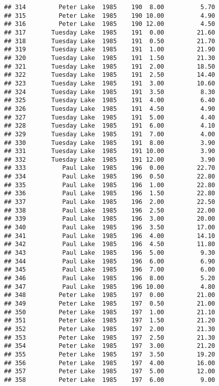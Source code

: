 \documentclass[
]{article}
\begin{document}
\begin{verbatim}
## 314         Peter Lake  1985    190  8.00          5.70
## 315         Peter Lake  1985    190 10.00          4.90
## 316         Peter Lake  1985    190 12.00          4.50
## 317       Tuesday Lake  1985    191  0.00         21.60
## 318       Tuesday Lake  1985    191  0.50         21.70
## 319       Tuesday Lake  1985    191  1.00         21.90
## 320       Tuesday Lake  1985    191  1.50         21.30
## 321       Tuesday Lake  1985    191  2.00         18.50
## 322       Tuesday Lake  1985    191  2.50         14.40
## 323       Tuesday Lake  1985    191  3.00         10.60
## 324       Tuesday Lake  1985    191  3.50          8.30
## 325       Tuesday Lake  1985    191  4.00          6.40
## 326       Tuesday Lake  1985    191  4.50          4.90
## 327       Tuesday Lake  1985    191  5.00          4.40
## 328       Tuesday Lake  1985    191  6.00          4.10
## 329       Tuesday Lake  1985    191  7.00          4.00
## 330       Tuesday Lake  1985    191  8.00          3.90
## 331       Tuesday Lake  1985    191 10.00          3.90
## 332       Tuesday Lake  1985    191 12.00          3.90
## 333          Paul Lake  1985    196  0.00         22.70
## 334          Paul Lake  1985    196  0.50         22.80
## 335          Paul Lake  1985    196  1.00         22.80
## 336          Paul Lake  1985    196  1.50         22.80
## 337          Paul Lake  1985    196  2.00         22.50
## 338          Paul Lake  1985    196  2.50         22.00
## 339          Paul Lake  1985    196  3.00         20.00
## 340          Paul Lake  1985    196  3.50         17.00
## 341          Paul Lake  1985    196  4.00         14.10
## 342          Paul Lake  1985    196  4.50         11.80
## 343          Paul Lake  1985    196  5.00          9.30
## 344          Paul Lake  1985    196  6.00          6.90
## 345          Paul Lake  1985    196  7.00          6.00
## 346          Paul Lake  1985    196  8.00          5.20
## 347          Paul Lake  1985    196 10.00          4.80
## 348         Peter Lake  1985    197  0.00         21.00
## 349         Peter Lake  1985    197  0.50         21.00
## 350         Peter Lake  1985    197  1.00         21.10
## 351         Peter Lake  1985    197  1.50         21.20
## 352         Peter Lake  1985    197  2.00         21.30
## 353         Peter Lake  1985    197  2.50         21.30
## 354         Peter Lake  1985    197  3.00         21.20
## 355         Peter Lake  1985    197  3.50         19.20
## 356         Peter Lake  1985    197  4.00         16.00
## 357         Peter Lake  1985    197  5.00         12.00
## 358         Peter Lake  1985    197  6.00          9.00

\end{verbatim}
\end{document}
